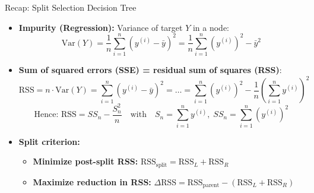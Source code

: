 \documentclass[10pt,compress,t,notes=noshow, xcolor=table]{beamer}
\begin{document}
\begin{frame}{Recap: Split Selection Decision Tree}
  \begin{itemize}
    \item \textbf{Impurity (Regression):} Variance of target $Y$ in a node:
    \[ \text{Var}(Y) = \frac{1}{n}\sum_{i=1}^n (y^{(i)} - \bar{y})^2 = \frac{1}{n} \sum_{i=1}^n (y^{(i)})^2 - \bar{y}^2 \]
    \item \textbf{Sum of squared errors (SSE) =  residual sum of squares (RSS)}: 
$$%
\text{RSS} 
= n \cdot \text{Var}(Y) = \sum_{i=1}^n (y^{(i)} - \bar{y})^2 = 
\dots = 
\sum_{i=1}^n (y^{(i)})^2 - \frac{1}{n} \left(\sum_{i=1}^n y^{(i)}\right)^2
$$
      \[
        \text{Hence: } \boxed{\text{RSS}=SS_{n}-\dfrac{S_{n}^{2}}{n}
        \quad\text{with}\quad
        S_{n}=\sum_{i=1}^{n}y^{(i)},\;
        SS_{n}=\sum_{i=1}^{n}(y^{(i)})^{2}}
      \]
    \item \textbf{Split criterion:} 
    \begin{itemize}
    \item \textbf{Minimize post-split RSS:}
    $
    \text{RSS}_{\text{split}} = \text{RSS}_L + \text{RSS}_R
    $
    \item \textbf{Maximize reduction in RSS:}
    $
    \Delta \text{RSS} = \text{RSS}_{\text{parent}} - (\text{RSS}_L + \text{RSS}_R)
    $
  \end{itemize}
  \end{itemize}
\end{frame}
\end{document}
